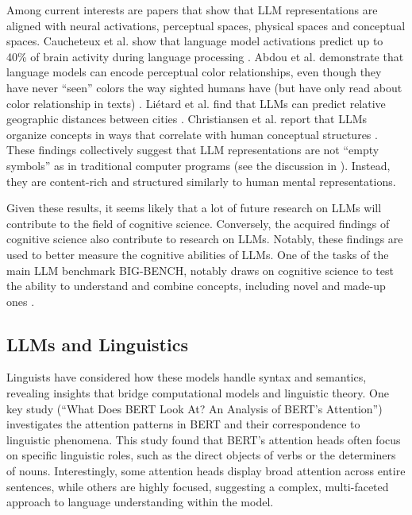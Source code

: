Among current interests are papers that show that LLM representations are aligned with neural activations,  perceptual spaces,  physical spaces and conceptual spaces. Caucheteux et al. show that language model activations predict up to 40\% of brain activity during language processing \cite{caucheteux2022brains}. Abdou et al. demonstrate that language models can encode perceptual color relationships, even though they have never ``seen'' colors the way sighted humans have (but have only read about color relationship in texts) \cite{abdou2021can}. Liétard et al. find that LLMs can predict relative geographic distances between cities \cite{lietard2021do}. Christiansen et al. report that LLMs organize concepts in ways that correlate with human conceptual structures \cite{christiansen2023large}. These findings collectively suggest that LLM representations are not ``empty symbols'' as in traditional computer programs (see the discussion in ). Instead, they are content-rich and structured similarly to human mental representations.

Given these results, it seems likely that a lot of future research on LLMs will contribute to the field of cognitive science. Conversely, the acquired findings of cognitive science also contribute to research on LLMs. Notably, these findings are used to better measure the cognitive abilities of LLMs. One of the tasks of the main LLM benchmark BIG-BENCH, notably draws on cognitive science to test the ability to understand and combine concepts, including novel and made-up ones \cite{srivastava2022beyond}.

\subsection{LLMs and Linguistics}

Linguists have considered how these models handle syntax and semantics, revealing insights that bridge computational models and linguistic theory. One key study (``What Does BERT Look At? An Analysis of BERT's Attention'') investigates the attention patterns in BERT and their correspondence to linguistic phenomena. This study found that BERT's attention heads often focus on specific linguistic roles, such as the direct objects of verbs or the determiners of nouns. Interestingly, some attention heads display broad attention across entire sentences, while others are highly focused, suggesting a complex, multi-faceted approach to language understanding within the model. 

